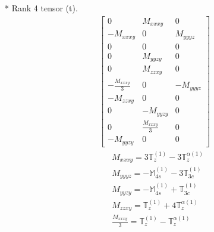 \documentclass[fleqn,8pt,landscape]{jsarticle}
\begin{document}
* Rank 4 tensor (t).
\begin{align*}
\begin{bmatrix} 0 & M_{xxxy} & 0 \\ - M_{xxxy} & 0 & M_{yyyz} \\ 0 & 0 & 0 \\ 0 & M_{yyzy} & 0 \\ 0 & M_{zzxy} & 0 \\ - \frac{M_{xxxy}}{3} & 0 & - M_{yyyz} \\ - M_{zzxy} & 0 & 0 \\ 0 & - M_{yyzy} & 0 \\ 0 & \frac{M_{xxxy}}{3} & 0 \\ - M_{yyzy} & 0 & 0 \end{bmatrix}
\end{align*}
\begin{align*}
& M_{xxxy} = 3 \mathbb{T}_{z}^{(1)} - 3 \mathbb{T}_{z}^{\alpha(1)} \\
& M_{yyyz} = - \mathbb{M}_{4s}^{(1)} - 3 \mathbb{T}_{3c}^{(1)} \\
& M_{yyzy} = - \mathbb{M}_{4s}^{(1)} + \mathbb{T}_{3c}^{(1)} \\
& M_{zzxy} = \mathbb{T}_{z}^{(1)} + 4 \mathbb{T}_{z}^{\alpha(1)} \\
& \frac{M_{xxxy}}{3} = \mathbb{T}_{z}^{(1)} - \mathbb{T}_{z}^{\alpha(1)}
\end{align*}
\end{document}
